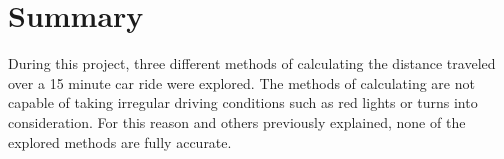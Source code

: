 \documentclass[12 pt]{article}
\begin{document}
\section{Summary}
During this project, three different methods of calculating the distance traveled over a 15 minute car ride were explored. The methods of calculating are not capable of taking irregular driving conditions such as red lights or turns into consideration. For this reason and others previously explained, none of the explored methods are fully accurate.
\end{document}
